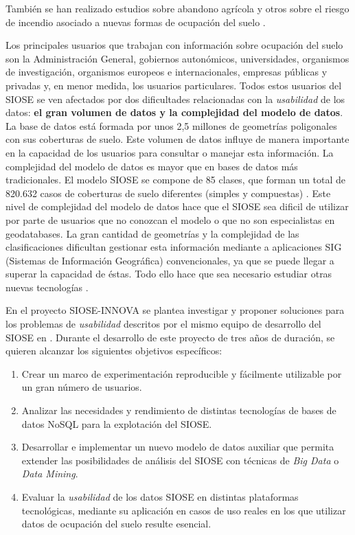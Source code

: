 También se han realizado estudios sobre abandono agrícola \citep{Zaragozi2011} y otros sobre el riesgo de incendio asociado a nuevas formas de ocupación del suelo \citet{Vazquez2017}.

Los principales usuarios que trabajan con información sobre ocupación del suelo son la Administración General, gobiernos autonómicos, universidades, organismos de investigación, organismos europeos e internacionales, empresas públicas y privadas y, en menor medida, los usuarios particulares. Todos estos usuarios del SIOSE se ven afectados por dos dificultades relacionadas con la \textit{usabilidad} de los datos: \textbf{el gran volumen de datos y la complejidad del modelo de datos}. La base de datos está formada por unos 2,5 millones de geometrías poligonales con sus coberturas de suelo. Este volumen de datos influye de manera importante en la capacidad de los usuarios para consultar o manejar esta información. La complejidad del modelo de datos es mayor que en bases de datos más tradicionales. El modelo SIOSE se compone de 85 clases, que forman un total de 820.632 casos de coberturas de suelo diferentes (simples y compuestas) \citep{FernandezVillarino2012}. Este nivel de complejidad del modelo de datos hace que el SIOSE sea dificil de utilizar por parte de usuarios que no conozcan el modelo o que no son especialistas en geodatabases. La gran cantidad de geometrías y la complejidad de las clasificaciones dificultan gestionar esta información mediante a aplicaciones SIG (Sistemas de Información Geográfica) convencionales, ya que se puede llegar a superar la capacidad de éstas. Todo ello hace que sea necesario estudiar otras nuevas tecnologías \citep{NavarroCarrion2016}.

En el proyecto SIOSE-INNOVA se plantea investigar y proponer soluciones para los problemas de \textit{usabilidad} descritos por el mismo equipo de desarrollo del SIOSE en \citet{FernandezVillarino2012}. Durante el desarrollo de este proyecto de tres años de duración, se quieren alcanzar los siguientes objetivos específicos:
\begin{enumerate}
\item Crear un marco de experimentación reproducible y fácilmente utilizable por un gran número de usuarios.
\item Analizar las necesidades y rendimiento de distintas tecnologías de bases de datos NoSQL para la explotación del SIOSE.
\item Desarrollar e implementar un nuevo modelo de datos auxiliar que permita extender las posibilidades de análisis del SIOSE con técnicas de \textit{Big Data} o \textit{Data Mining}.
\item Evaluar la \textit{usabilidad} de los datos SIOSE en distintas plataformas tecnológicas, mediante su aplicación en casos de uso reales en los que utilizar datos de ocupación del suelo resulte esencial.
\end{enumerate}


